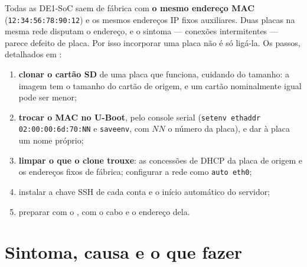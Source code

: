 Todas as DE1-SoC saem de fábrica com \textbf{o mesmo endereço MAC}
(\texttt{12:34:56:78:90:12}) e os mesmos endereços IP fixos auxiliares. Duas
placas na mesma rede disputam o endereço, e o sintoma --- conexões
intermitentes --- parece defeito de placa. Por isso incorporar uma placa não é
só ligá-la. Os passos, detalhados em :

\begin{enumerate}
  \item \textbf{clonar o cartão SD} de uma placa que funciona, cuidando do
    tamanho: a imagem tem o tamanho do cartão de origem, e um cartão
    nominalmente igual pode ser menor;
  \item \textbf{trocar o MAC no U-Boot}, pelo console serial
    (\texttt{setenv ethaddr 02:00:00:6d:70:NN} e \texttt{saveenv}, com \(NN\) o
    número da placa), e dar à placa um nome próprio;
  \item \textbf{limpar o que o clone trouxe}: as concessões de DHCP da placa de
    origem e os endereços fixos de fábrica; configurar a rede como
    \texttt{auto eth0};
  \item instalar a chave SSH de cada conta e o início automático do servidor;
  \item preparar com o , com o cabo e o endereço dela.
\end{enumerate}

\section{Sintoma, causa e o que fazer}

